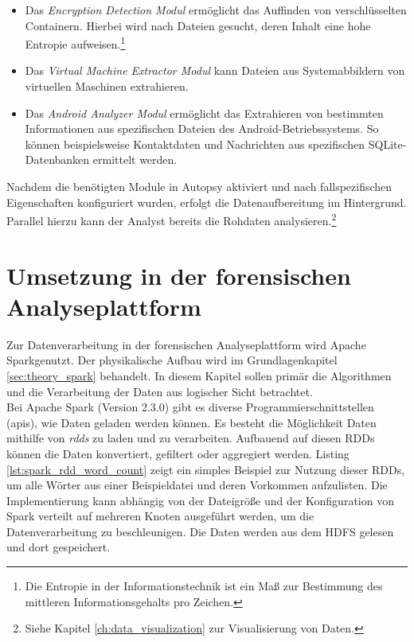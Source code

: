 \begin{itemize}
\item Das \textit{Encryption Detection Modul} ermöglicht das Auffinden von verschlüsselten Containern. Hierbei wird nach Dateien gesucht, deren Inhalt eine hohe Entropie aufweisen.\footnote{Die Entropie in der Informationstechnik ist ein Maß zur Bestimmung des mittleren Informationsgehalts pro Zeichen. 
}
\item Das \textit{Virtual Machine Extractor Modul} kann Dateien aus Systemabbildern von virtuellen Maschinen extrahieren.
\item Das \textit{Android Analyzer Modul} ermöglicht das Extrahieren von bestimmten Informationen aus spezifischen Dateien des Android-Betriebssystems. So können beispielsweise Kontaktdaten und Nachrichten aus spezifischen SQLite-Datenbanken ermittelt werden.
\end{itemize}

\noindent
Nachdem die benötigten Module in Autopsy aktiviert und nach fallspezifischen Eigenschaften konfiguriert wurden, erfolgt die Datenaufbereitung im Hintergrund. Parallel hierzu kann der Analyst bereits die Rohdaten analysieren.\footnote{Siehe Kapitel \ref{ch:data_visualization} zur Visualisierung von Daten.}\\

\section{Umsetzung in der forensischen Analyseplattform}

Zur Datenverarbeitung in der forensischen Analyseplattform wird Apache Spark\texttrademark\thinspace genutzt. Der physikalische Aufbau wird im Grundlagenkapitel \ref{sec:theory_spark} behandelt. In diesem Kapitel sollen primär die Algorithmen und die Verarbeitung der Daten aus logischer Sicht betrachtet.\\ 

\noindent
Bei Apache Spark (Version 2.3.0) gibt es diverse Programmierschnittstellen (\acrshort{api}s), wie Daten geladen werden können. Es besteht die Möglichkeit Daten mithilfe von \textit{\glspl{rdd}} zu laden und zu verarbeiten. Aufbauend auf diesen RDDs können die Daten konvertiert, gefiltert oder aggregiert werden.
Listing \ref{lst:spark_rdd_word_count} zeigt ein simples Beispiel zur Nutzung dieser RDDs, um alle Wörter aus einer Beispieldatei  und deren Vorkommen aufzulisten. Die Implementierung kann abhängig von der Dateigröße und der Konfiguration von Spark verteilt auf mehreren Knoten ausgeführt werden, um die Datenverarbeitung zu beschleunigen. Die Daten werden aus dem HDFS gelesen und dort gespeichert.

